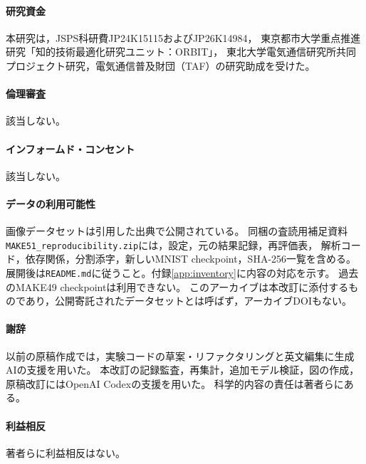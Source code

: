 \documentclass[11pt,a4paper]{ltjsarticle}
\begin{document}
\paragraph{研究資金}
本研究は，JSPS科研費JP24K15115およびJP26K14984，
東京都市大学重点推進研究「知的技術最適化研究ユニット：ORBIT」，
東北大学電気通信研究所共同プロジェクト研究，電気通信普及財団（TAF）の研究助成を受けた。
\paragraph{倫理審査}該当しない。
\paragraph{インフォームド・コンセント}該当しない。
\paragraph{データの利用可能性}
画像データセットは引用した出典で公開されている。
同梱の査読用補足資料\texttt{MAKE51\_reproducibility.zip}には，設定，元の結果記録，再評価表，
解析コード，依存関係，分割添字，新しいMNIST checkpoint，SHA-256一覧を含める。
展開後は\texttt{README.md}に従うこと。付録\ref{app:inventory}に内容の対応を示す。
過去のMAKE49 checkpointは利用できない。
このアーカイブは本改訂に添付するものであり，公開寄託されたデータセットとは呼ばず，アーカイブDOIもない。
\paragraph{謝辞}
以前の原稿作成では，実験コードの草案・リファクタリングと英文編集に生成AIの支援を用いた。
本改訂の記録監査，再集計，追加モデル検証，図の作成，原稿改訂にはOpenAI Codexの支援を用いた。
科学的内容の責任は著者らにある。
\paragraph{利益相反}著者らに利益相反はない。

\clearpage
\appendix
\end{document}
